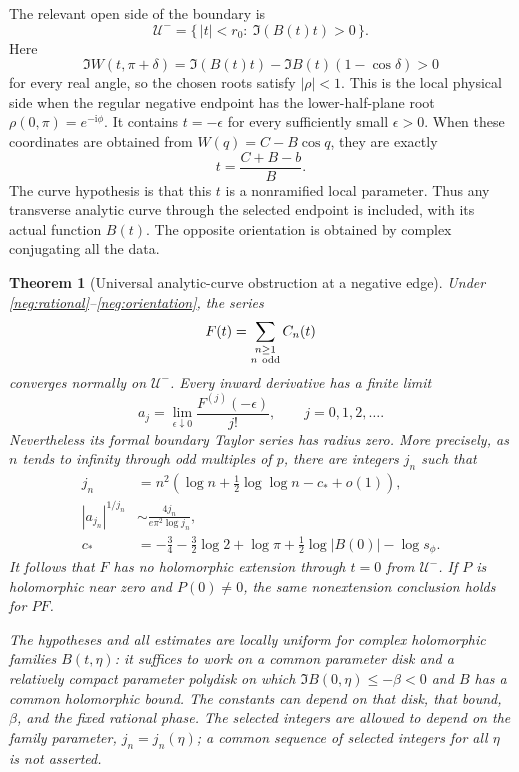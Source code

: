\documentclass[11pt]{article}
\numberwithin{equation}{section}
\newtheorem{theorem}{Theorem}[section]
\theoremstyle{definition}
\newcommand{\ii}{\mathrm i}
\begin{document}
The relevant open side of the boundary is
\begin{equation}
 \mathcal U^-=\{\,|t|<r_0:\ \Im(B(t)t)>0\,\}.
 \label{neg:physical-side}
\end{equation}
Here
\[
 \Im W(t,\pi+\delta)
   =\Im(B(t)t)-\Im B(t)(1-\cos\delta)>0
 \]
for every real angle, so the chosen roots satisfy \(|\rho|<1\).
This is the local physical side when the regular negative endpoint
has the lower-half-plane root \(\rho(0,\pi)=e^{-\ii\phi}\).
It contains \(t=-\epsilon\) for every sufficiently small
\(\epsilon>0\).  When these coordinates are obtained from
\(W(q)=C-B\cos q\), they are exactly
\[
 t=\frac{C+B-b}{B}.
 \]
The curve hypothesis is that this \(t\) is a nonramified local
parameter.  Thus any transverse analytic curve through the selected
endpoint is included, with its actual function \(B(t)\).  The opposite
orientation is obtained by complex conjugating all the data.

\begin{theorem}[Universal analytic-curve obstruction at a negative edge]
\label{neg:theorem}
Under \eqref{neg:rational}--\eqref{neg:orientation}, the series
\[
 F(t)=\sum_{\substack{n\ge1\\n\ {\rm odd}}}C_n(t)
 \]
converges normally on \(\mathcal U^-\).  Every inward derivative has
a finite limit
\begin{equation}
 a_j=\lim_{\epsilon\downarrow0}\frac{F^{(j)}(-\epsilon)}{j!},
 \qquad j=0,1,2,\ldots .
 \label{neg:jets}
\end{equation}
Nevertheless its formal boundary Taylor series has radius zero.
More precisely, as \(n\) tends to infinity through odd multiples of
\(p\), there are integers \(j_n\) such that
\begin{align}
 j_n&=n^2\left(\log n+\tfrac12\log\log n-c_*+o(1)\right),
 \label{neg:jn-statement}\\
 |a_{j_n}|^{1/j_n}
   &\sim \frac{4j_n}{e\pi^2\log j_n},
 \label{neg:growth-statement}\\
 c_*&=-\frac34-\frac32\log2+\log\pi
            +\frac12\log|B(0)|-\log s_\phi .
 \label{neg:cstar}
\end{align}
It follows that \(F\) has no holomorphic extension through \(t=0\)
from \(\mathcal U^-\).  If \(P\) is holomorphic near zero and
\(P(0)\ne0\), the same nonextension conclusion holds for \(P F\).

The hypotheses and all estimates are locally uniform for complex
holomorphic families \(B(t,\eta)\): it suffices to work on a common
parameter disk and a relatively compact parameter polydisk on which
\(\Im B(0,\eta)\le-\beta<0\) and \(B\) has a common holomorphic bound.
The constants can depend on that disk, that bound, \(\beta\), and the
 fixed rational phase.  The selected integers are allowed to depend
 on the family parameter, \(j_n=j_n(\eta)\); a common sequence of
 selected integers for all \(\eta\) is not asserted.
\end{theorem}
\end{document}
